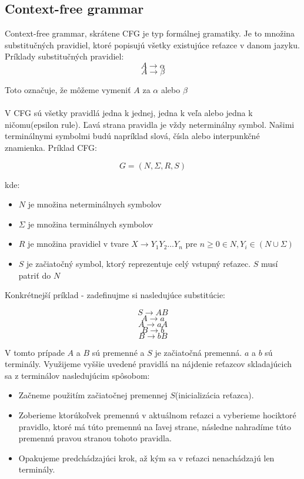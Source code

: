 \documentclass[12pt,a4paper]{report}
\theoremstyle{definition}
\theoremstyle{remark}
\begin{document}
\subsection{Context-free grammar}
Context-free grammar\cite{Girju}\cite{foja}, skrátene CFG je typ formálnej gramatiky. Je to množina substitučných pravidiel, ktoré popisujú všetky existujúce reťazce v danom jazyku. Príklady substitučných pravidiel:
$$ A \to \alpha $$
$$ A \to \beta $$

Toto označuje, že môžeme vymeniť $A$ za $\alpha$ alebo $\beta$ \\ \\
V CFG sú všetky pravidlá jedna k jednej, jedna k veľa alebo jedna k ničomu(epsilon rule). Ľavá strana pravidla je vždy neterminálny symbol. Našimi terminálnymi symbolmi budú napríklad slová, čísla alebo interpunkčné znamienka. Príklad CFG:

$$ G = (N, \Sigma , R, S) $$

kde:
\begin{itemize}
\item $N$ je množina neterminálnych symbolov
\item $\Sigma$ je množina terminálnych symbolov
\item $R$ je množina pravidiel v tvare $X \to Y_1 Y_2 \dots Y_n$ pre $ n \geq 0 \in N, Y_i \in ( N \cup \Sigma )$
\item $S$ je začiatočný symbol, ktorý reprezentuje celý vstupný reťazec. $S$ musí patriť do $N$
\end{itemize}

\noindent Konkrétnejší príklad - zadefinujme si nasledujúce substitúcie:

$$ S \to AB $$
$$ A \to a $$
$$ A \to aA $$
$$ B \to b $$
$$ B \to bB $$

V tomto prípade $A$ a $B$ sú premenné a $S$ je začiatočná premenná. $a$ a $b$ sú terminály. Využijeme vyššie uvedené pravidlá na nájdenie reťazcov skladajúcich sa z terminálov nasledujúcim spôsobom:
\begin{itemize}
\item Začneme použitím začiatočnej premennej $S$(inicializácia reťazca).
\item Zoberieme ktorúkoľvek premennú v aktuálnom reťazci a vyberieme hociktoré pravidlo, ktoré má túto premennú na ľavej strane, následne nahradíme túto premennú pravou stranou tohoto pravidla.
\item Opakujeme predchádzajúci krok, až kým sa v reťazci nenachádzajú len terminály.
\end{itemize}
\end{document}
